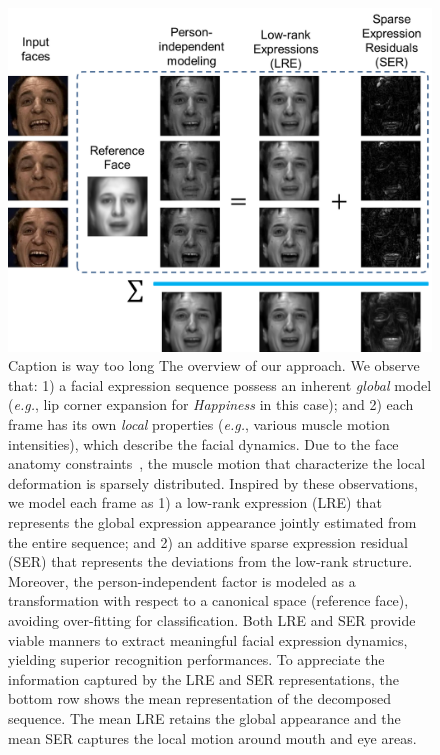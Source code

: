 \documentclass[journal]{IEEEtran}
\begin{document}
\begin{figure}[htbp]
	\centering
		\includegraphics[width=.95\columnwidth]{pics/splash.png}
	\caption{\textcolor[rgb]{1,0,0}{Caption is way too long} The overview of our approach. We observe that: 1) a facial expression sequence possess an inherent \textit{global} model (\textit{e.g.}, lip corner expansion for \textit{Happiness} in this case); and 2) each frame has its own \textit{local} properties (\textit{e.g.}, various muscle motion intensities), which describe the facial dynamics. Due to the face anatomy constraints~\cite{Ekman78}, the muscle motion that characterize the local deformation is sparsely distributed. Inspired by these observations, we model each frame as 1) a low-rank expression (LRE) that represents the global expression appearance jointly estimated from the entire sequence; and 2) an additive sparse expression residual (SER) that represents the deviations from the low-rank structure. Moreover, the person-independent factor is modeled as a transformation with respect to a canonical space (reference face), avoiding over-fitting for classification. Both LRE and SER provide viable manners to extract meaningful facial expression dynamics, yielding superior recognition performances. To appreciate the information captured by the LRE and SER representations, the bottom row shows the mean representation of the decomposed sequence. The mean LRE retains the global appearance and the mean SER captures the local motion around mouth and eye areas.}
	\label{fig:splash}
\end{figure}
\end{document}
